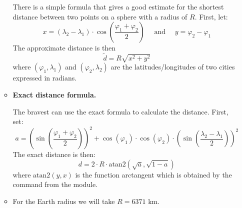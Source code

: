 \documentclass[11pt,class=report,crop=false]{standalone}
\begin{document}
\begin{activite}
\begin{enumerate}
\begin{itemize}
	There is a simple formula that gives a good estimate for the shortest distance between two points on a sphere with a radius of $R$.
    First, let:
    $$x =   (\lambda_2-\lambda_1)\cdot  \cos\left( \frac{\varphi_1+\varphi_2}{2} \right)
    \quad\text{ and }\quad 
    y = \varphi_2-\varphi_1$$
	The approximate distance is then 
	$$ \tilde d = R \sqrt{x^2 + y^2}$$		
	where $(\varphi_1,\lambda_1)$ and $(\varphi_2,\lambda_2)$ are the latitudes/longitudes of two cities expressed in radians.
	
	\item \textbf{Exact distance formula.}
	
	The bravest can use the exact formula to calculate the distance.
	First, set: 
	$$a = \left(\sin\left(\frac{\varphi_1+\varphi_2}{2}\right)\right)^2 + \cos(\varphi_1)\cdot \cos(\varphi_2) \cdot \left(\sin\left( \frac{\lambda_2-\lambda_1}{2} \right)\right)^2$$
    The exact distance is then:
    $$d = 2 \cdot R \cdot \text{atan2}\left(\sqrt{a},\sqrt{1-a}\right)$$
    where $\text{atan2}(y,x)$ is the function \og{}arctangent\fg{} which is obtained by the  command from the  module.	
	
	\item For the Earth radius we will take $R = 6371$ km.

\end{itemize}
  
\end{enumerate}   
     
\end{activite}
\end{document}
